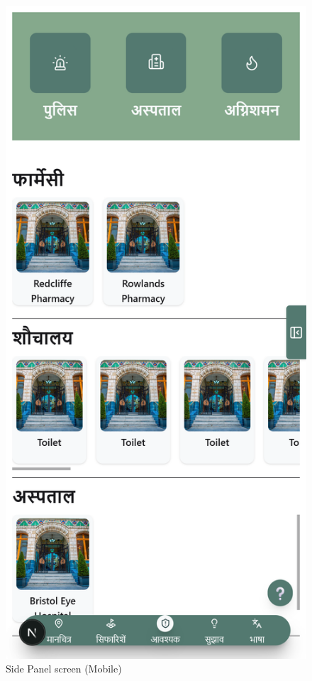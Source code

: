 \begin{figure}[H]
    \centering
    \includegraphics[height=0.3\textheight,keepaspectratio]{images/Screenshots/3_sidepanel_mobile.png}
    \caption{Side Panel screen (Mobile)}
\end{figure}

